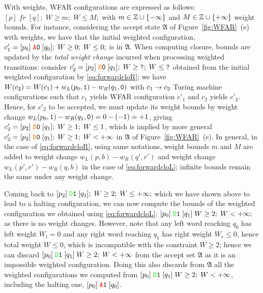 With weights, WFAR configurations are expressed as follows: $[p] \; fr \; [q];\; W \geq m; \; W \leq M;$ with $m \in \mathbb{Z} \cup\{-\infty\}$ and $M \in \mathbb{Z} \cup \{+\infty\}$ weight bounds. For instance, considering the accept state $\mathfrak{A}$ of Figure~\ref{fig:WFAR}~(e) with weights, we have that the initial weighted configuration, $c'_1 = [p_0] \; \texttt{\stateA}\szero \; [q_0];\; W \geq 0;\; W \leq 0;$ is in $\mathfrak{A}$. When computing closure, bounds are updated by the \textit{total weight change} incurred when processing weighted transitions: consider $c'_2 = [p_2] \; \texttt{\stateB}\szero \; [q_1];\; W \geq \texttt{?};\; W \leq \texttt{?}$ obtained from the initial weighted configuration by \eqref{eq:forwardcloR}; we have $W(c_2) = W(c_1) + w_L(p_0,\texttt{1}) - w_R(q_1, \texttt{0})$ with $c_1 \to c_2$ Turing machine configurations such that $c_1$ yields WFAR configuration $c'_1$ and $c_2$ yields $c'_2$. Hence, for $c'_2$ to be accepted, we must update its weight bounds by weight change $w_L(p_0,\texttt{1}) - w_R(q_1, \texttt{0}) = 0 - (- 1) = +1$, giving $c'_2 = [p_2] \; \texttt{\stateB}\szero \; [q_1];\; W \geq 1;\; W \leq 1$, which is implied by more general $c'_2 = [p_2] \; \texttt{\stateB}\szero \; [q_1];\; W \geq 1;\; W < +\infty$ in $\mathfrak{A}$ of Figure~\ref{fig:WFAR}~(e). In general, in the case of \eqref{eq:forwardcloR}, using same notations, weight bounds $m$ and $M$ are added to weight change $w_L(p,b) - w_R(q', r')$ and weight change $w_L(p',r') - w_R(q,b)$ in the case of \eqref{eq:forwardcloL}; infinite bounds remain the same under any weight change.

Coming back to $[p_2] \; \texttt{\stateD}\sone \; [q_1];\; W \geq 2;\; W \leq + \infty;$ which we have shown above to lead to a halting configuration, we can now compute the bounds of the weighted configuration we obtained using \eqref{eq:forwardcloL}: $[p_0] \; \texttt{\stateD}\sone \; [q_1]\; W \geq 2; \; W < +\infty;$ as there is no weight changes. However, note that any left word reaching $q_0$ has left weight $W_l = 0$ and any right word reaching $q_1$ has right weight $W_r \leq 0$, hence total weight $W \leq 0$, which is incompatible with the constraint $W \geq 2$; hence we can discard $[p_0] \; \texttt{\stateD}\sone \; [q_1]\; W \geq 2; \; W < +\infty$ from the accept set $\mathfrak{A}$ as it is an impossible weighted configuration. Doing this also discards from $\mathfrak{A}$ all the weighted configurations we computed from $[p_0] \; \texttt{\stateD}\sone \; [q_1]\; W \geq 2; \; W < +\infty$, including the halting one, $[p_0] \; \texttt{\stateA}\sone \; [q_0] $.

